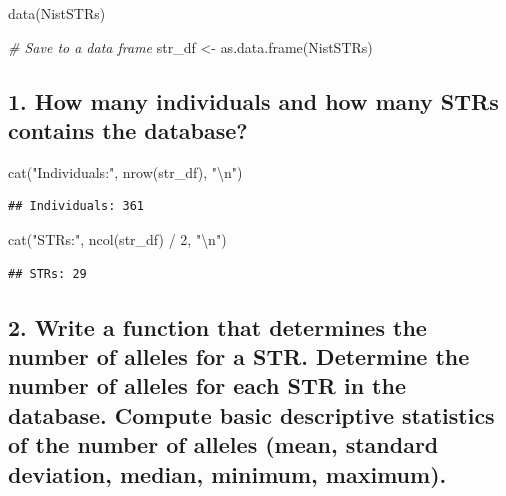 \documentclass[
]{article}
\newenvironment{Shaded}{\begin{snugshade}}{\end{snugshade}}
\newcommand{\CommentTok}[1]{\textcolor[rgb]{0.56,0.35,0.01}{\textit{#1}}}
\newcommand{\DecValTok}[1]{\textcolor[rgb]{0.00,0.00,0.81}{#1}}
\newcommand{\FunctionTok}[1]{\textcolor[rgb]{0.00,0.00,0.00}{#1}}
\newcommand{\NormalTok}[1]{#1}
\newcommand{\OtherTok}[1]{\textcolor[rgb]{0.56,0.35,0.01}{#1}}
\newcommand{\SpecialCharTok}[1]{\textcolor[rgb]{0.00,0.00,0.00}{#1}}
\newcommand{\StringTok}[1]{\textcolor[rgb]{0.31,0.60,0.02}{#1}}
\begin{document}
\begin{Shaded}
\begin{Highlighting}[]
\FunctionTok{data}\NormalTok{(NistSTRs)}

\CommentTok{\# Save to a data frame}
\NormalTok{str\_df }\OtherTok{\textless{}{-}} \FunctionTok{as.data.frame}\NormalTok{(NistSTRs)}
\end{Highlighting}
\end{Shaded}

\hypertarget{how-many-individuals-and-how-many-strs-contains-the-database}{%
\subsection{1. How many individuals and how many STRs contains the
database?}\label{how-many-individuals-and-how-many-strs-contains-the-database}}

\begin{Shaded}
\begin{Highlighting}[]
\FunctionTok{cat}\NormalTok{(}\StringTok{"Individuals:"}\NormalTok{, }\FunctionTok{nrow}\NormalTok{(str\_df), }\StringTok{"}\SpecialCharTok{\textbackslash{}n}\StringTok{"}\NormalTok{)}
\end{Highlighting}
\end{Shaded}

\begin{verbatim}
## Individuals: 361
\end{verbatim}

\begin{Shaded}
\begin{Highlighting}[]
\FunctionTok{cat}\NormalTok{(}\StringTok{"STRs:"}\NormalTok{, }\FunctionTok{ncol}\NormalTok{(str\_df) }\SpecialCharTok{/} \DecValTok{2}\NormalTok{, }\StringTok{"}\SpecialCharTok{\textbackslash{}n}\StringTok{"}\NormalTok{)}
\end{Highlighting}
\end{Shaded}

\begin{verbatim}
## STRs: 29
\end{verbatim}

\hypertarget{write-a-function-that-determines-the-number-of-alleles-for-a-str.-determine-the-number-of-alleles-for-each-str-in-the-database.-compute-basic-descriptive-statistics-of-the-number-of-alleles-mean-standard-deviation-median-minimum-maximum.}{%
\subsection{2. Write a function that determines the number of alleles
for a STR. Determine the number of alleles for each STR in the database.
Compute basic descriptive statistics of the number of alleles (mean,
standard deviation, median, minimum,
maximum).}\label{write-a-function-that-determines-the-number-of-alleles-for-a-str.-determine-the-number-of-alleles-for-each-str-in-the-database.-compute-basic-descriptive-statistics-of-the-number-of-alleles-mean-standard-deviation-median-minimum-maximum.}}
\end{document}
